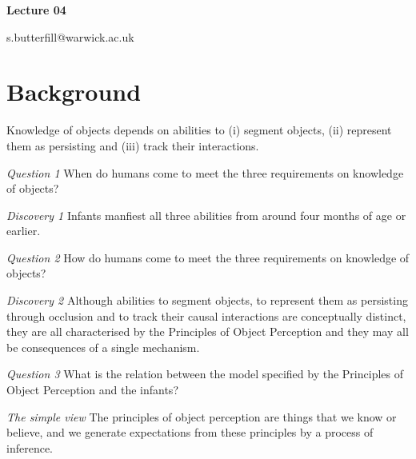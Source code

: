 \documentclass[12pt]{extarticle}
\date{}
\makeatletter
\def \ititle {Origins of Mind}
\def \iemail{s.butterfill@warwick.ac.uk}
\makeatother
\begin{document}
\begin{multicols}{3}

\setlength\footnotesep{1em}













\def \ititle {Lecture 04}

\begin{center}

{\Large

\textbf{\ititle}

}



\iemail %

\end{center}

\section{Background}

Knowledge of objects depends on abilities to (i) segment objects, (ii) represent them as
persisting and (iii) track their interactions.

\emph{Question 1}  When do humans come to meet the three requirements on knowledge of objects?

\emph{Discovery 1} Infants manfiest all three abilities from around four months of age or earlier.

\emph{Question 2}  How do humans come to meet the three requirements on knowledge of objects?

\emph{Discovery 2} Although abilities to segment objects, to represent them as persisting through
occlusion and to track their causal interactions are conceptually distinct, they
are all characterised by the Principles of Object Perception and they may all be
consequences of a single mechanism.

\emph{Question 3} What is the relation between the model specified by the Principles of Object
Perception and the infants?

\textit{The simple view}
The principles of object perception are things that we know or believe,
and we generate expectations from these principles by a process of inference.


\end{multicols}
\end{document}
